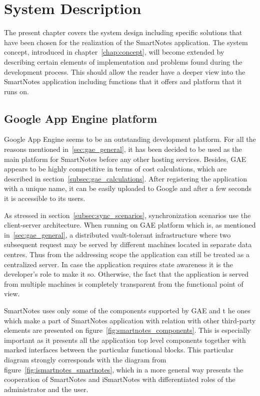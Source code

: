 \chapter{System Description}\label{chap:sys_description}
The present chapter covers the system design including specific solutions that have been chosen for the realization of the SmartNotes application. The system concept, introduced in chapter~\ref{chap:concept}, will become extended by describing certain elements of implementation and problems found during the development process. This should allow the reader have a deeper view into the SmartNotes application including functions that it offers and platform that it runs on.
\section{Google App Engine platform}\label{sec:gae}
Google App Engine seems to be an outstanding development platform. For all the reasons mentioned in~\ref{sec:gae_general}, it has been decided to be used as the main platform for SmartNotes before any other hosting services. Besides, GAE appears to be highly competitive in terms of cost calculations, which are described in section~\ref{subsec:gae_calculations}. After registering the application with a unique name, it can be easily uploaded to Google and after a few seconds it is accessible to its users.

As stressed in section~\ref{subsec:sync_scenarios}, synchronization scenarios use the client-server architecture. When running on GAE platform which is, as mentioned in~\ref{sec:gae_general}, a distributed vault-tolerant infrastructure where two subsequent request may be served by different machines located in separate data centres. Thus from the addressing scope the application can still be treated as a centralized server. In case the application requires state awareness it is the developer's role to make it so. Otherwise, the fact that the application is served from multiple machines is completely transparent from the functional point of view.

SmartNotes uses only some of the components supported by GAE and t he ones which make a part of SmartNotes application with relation with other third-party elements are presented on figure~\ref{fig:smartnotes_components}. This is especially important as it presents all the application top level components together with marked interfaces between the particular functional blocks. This particular diagram strongly corresponds with the diagram from figure~\ref{fig:ismartnotes_smartnotes}, which in a more general way presents the cooperation of SmartNotes and iSmartNotes with differentiated roles of the administrator and the user. 

